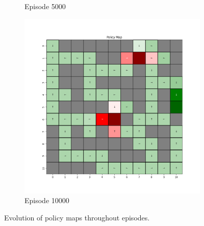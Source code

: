 \documentclass{assignment}
\begin{document}
\begin{figure}[H]
\begin{subfigure}{0.3\textwidth}
    \caption{Episode 5000}
    \end{subfigure}\hfill
    \begin{subfigure}{0.3\textwidth}
        \includegraphics[width=\textwidth]{figures/policy_td/gamma_sweep/policy_alpha_0.1_gamma_0.25_epsilon_0.2_iteration_10000.png}
    \caption{Episode 10000}
    \end{subfigure}
    \caption{Evolution of policy maps throughout episodes.}
    \label{fig:gamma_0.25_td_learning_policy}
\end{figure}
\end{document}
